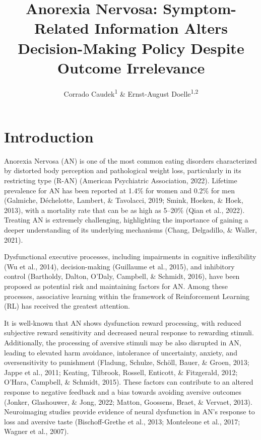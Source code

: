 \documentclass[
  man,floatsintext]{apa6}
\title{Anorexia Nervosa: Symptom-Related Information Alters Decision-Making Policy Despite Outcome Irrelevance}
\author{Corrado Caudek\textsuperscript{1} \& Ernst-August Doelle\textsuperscript{1,2}}
\date{}
\affiliation{\vspace{0.5cm}\textsuperscript{1} Wilhelm-Wundt-University\\\textsuperscript{2} Konstanz Business School}
\begin{document}
\maketitle

\hypertarget{introduction}{%
\section{Introduction}\label{introduction}}

Anorexia Nervosa (AN) is one of the most common eating disorders characterized by distorted body perception and pathological weight loss, particularly in its restricting type (R-AN) (American Psychiatric Association, 2022). Lifetime prevalence for AN has been reported at 1.4\% for women and 0.2\% for men (Galmiche, Déchelotte, Lambert, \& Tavolacci, 2019; Smink, Hoeken, \& Hoek, 2013), with a mortality rate that can be as high as 5--20\% (Qian et al., 2022). Treating AN is extremely challenging, highlighting the importance of gaining a deeper understanding of its underlying mechanisms (Chang, Delgadillo, \& Waller, 2021).

Dysfunctional executive processes, including impairments in cognitive inflexibility (Wu et al., 2014), decision-making (Guillaume et al., 2015), and inhibitory control (Bartholdy, Dalton, O'Daly, Campbell, \& Schmidt, 2016), have been proposed as potential risk and maintaining factors for AN. Among these processes, associative learning within the framework of Reinforcement Learning (RL) has received the greatest attention.

It is well-known that AN shows dysfunction reward processing, with reduced subjective reward sensitivity and decreased neural response to rewarding stimuli. Additionally, the processing of aversive stimuli may be also disrupted in AN, leading to elevated harm avoidance, intolerance of uncertainty, anxiety, and oversensitivity to punishment (Fladung, Schulze, Schöll, Bauer, \& Groen, 2013; Jappe et al., 2011; Keating, Tilbrook, Rossell, Enticott, \& Fitzgerald, 2012; O'Hara, Campbell, \& Schmidt, 2015). These factors can contribute to an altered response to negative feedback and a bias towards avoiding aversive outcomes (Jonker, Glashouwer, \& Jong, 2022; Matton, Goossens, Braet, \& Vervaet, 2013). Neuroimaging studies provide evidence of neural dysfunction in AN's response to loss and aversive taste (Bischoff-Grethe et al., 2013; Monteleone et al., 2017; Wagner et al., 2007).
\end{document}
